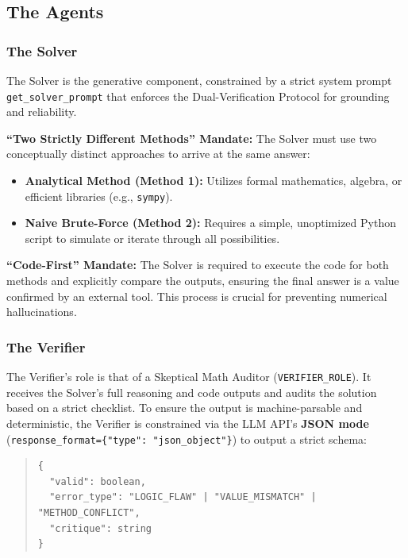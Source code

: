 \documentclass{article}
\begin{document}
\subsection{The Agents}

\subsubsection{The Solver}

The Solver is the generative component, constrained by a strict system prompt
\texttt{get\_solver\_prompt} that enforces the Dual-Verification Protocol for
grounding and reliability.

\textbf{``Two Strictly Different Methods'' Mandate:}
The Solver must use two conceptually distinct approaches to arrive at the same answer:

\begin{itemize}
  \item \textbf{Analytical Method (Method 1):}
  Utilizes formal mathematics, algebra, or efficient libraries (e.g., \texttt{sympy}).
  
  \item \textbf{Naive Brute-Force (Method 2):}
  Requires a simple, unoptimized Python script to simulate or iterate through all possibilities.
\end{itemize}

\textbf{``Code-First'' Mandate:}
The Solver is required to execute the code for both methods and explicitly compare the outputs,
ensuring the final answer is a value confirmed by an external tool. This process is crucial
for preventing numerical hallucinations.

\subsubsection{The Verifier}

The Verifier's role is that of a Skeptical Math Auditor (\texttt{VERIFIER\_ROLE}). It receives the Solver's full reasoning and code outputs and audits the solution based on a strict checklist. To ensure the output is machine-parsable and deterministic, the Verifier is constrained via the LLM API's \textbf{JSON mode} (\texttt{response\_format=\{"type": "json\_object"\}}) to output a strict schema:

\begin{quote}
\begin{verbatim}
{
  "valid": boolean,
  "error_type": "LOGIC_FLAW" | "VALUE_MISMATCH" | "METHOD_CONFLICT",
  "critique": string
}
\end{verbatim}
\end{quote}
\end{document}
